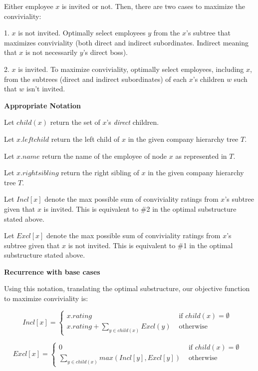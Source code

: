 \documentclass[a4paper]{report}
\begin{document}
\begin{enumerate}
      Either employee $x$ is invited or not. Then, there are two cases to maximize the conviviality: 

      1. $x$ is not invited. Optimally select employees $y$ from the $x$'s subtree that maximizes conviviality (both direct and indirect subordinates. 
      Indirect meaning that $x$ is not necessarily $y$'s direct boss).
      
      2. $x$ is invited. To maximize conviviality, optimally select employees, including $x$, from the subtrees (direct and indirect subordinates) of each $x$'s children
      $w$ such that $w$ isn't invited.


      {\bf Appropriate Notation}

      Let $child(x)$ return the set of $x$'s {\it direct} children. 

      Let $x.leftchild$ return the left child of $x$ in the given company hierarchy tree $T$.

      Let $x.name$ return the name of the employee of node $x$ as represented in $T$.

      Let $x.rightsibling$ return the right sibling of $x$ in the given company hierarchy tree $T$.

      Let $Incl[x]$ denote the max possible sum of conviviality ratings from $x$'s subtree given that $x$ is invited. This is equivalent to \#2 in the optimal substructure
      stated above. 

      Let $Excl[x]$ denote the max possible sum of conviviality ratings from $x$'s subtree given that $x$ is not invited. This is equivalent to \#1 in the optimal substructure
      stated above. 

      {\bf Recurrence with base cases}

      Using this notation, translating the optimal substructure, our objective function to maximize conviviality is:


      \begin{displaymath}
        Incl[x] = \left\{
          \begin{array}{lr}
            x.rating & \text{ if $child(x) = \emptyset$ }\\
            x.rating + \sum_{y \in child(x)} Excl(y)  & \text{ otherwise }
          \end{array}
          \right.
        \end{displaymath} 

      \begin{displaymath}
      Excl[x] = \left\{
        \begin{array}{lr}
          0 & \text{ if $child(x) = \emptyset$ }\\
          \sum_{y \in child(x)} max( Incl[y], Excl[y])   & \text{ otherwise }
        \end{array}
        \right.
      \end{displaymath} 



\end{enumerate}
\end{document}
